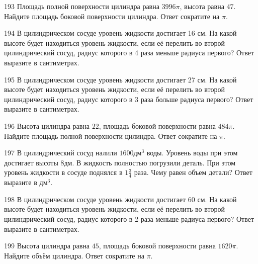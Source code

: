 \documentclass[4apaper]{article}
\begin{document}
\begin{taskBN}{193}
Площадь полной поверхности цилиндра равна $3996\pi$, высота равна $47$. Найдите площадь боковой поверхности цилиндра. Ответ сократите на $\pi$.
\end{taskBN}

\begin{taskBN}{194}
В цилиндрическом сосуде уровень жидкости достигает 16 см. На какой высоте будет находиться уровень жидкости, если её перелить во второй цилиндрический сосуд, радиус которого в 4 раза меньше радиуса первого? Ответ выразите в сантиметрах.
\end{taskBN}

\begin{taskBN}{195}
В цилиндрическом сосуде уровень жидкости достигает 27 см. На какой высоте будет находиться уровень жидкости, если её перелить во второй цилиндрический сосуд, радиус которого в 3 раза больше радиуса первого? Ответ выразите в сантиметрах.
\end{taskBN}

\begin{taskBN}{196}
Высота цилиндра равна $22$, площадь боковой поверхности равна $484\pi$. Найдите площадь полной поверхности цилиндра. Ответ сократите на $\pi$.
\end{taskBN}

\begin{taskBN}{197}
В цилиндрический сосуд налили $1600\mbox{дм}^3$ воды. Уровень воды при этом достигает высоты $8$дм. В жидкость полностью погрузили деталь. При этом уровень жидкости в сосуде поднялся в ${1}\frac{3}{4}$ раза. Чему равен объем детали? Ответ выразите в $\mbox{дм}^3$.
\end{taskBN}

\begin{taskBN}{198}
В цилиндрическом сосуде уровень жидкости достигает 60 см. На какой высоте будет находиться уровень жидкости, если её перелить во второй цилиндрический сосуд, радиус которого в 2 раза меньше радиуса первого? Ответ выразите в сантиметрах.
\end{taskBN}

\begin{taskBN}{199}
Высота цилиндра равна $45$, площадь боковой поверхности равна $1620\pi$. Найдите объём цилиндра. Ответ сократите на $\pi$.
\end{taskBN}
\end{document}
